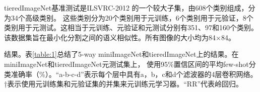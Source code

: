 tieredImageNet基准测试\cite{ren2018meta}是ILSVRC-2012 \cite{russakovsky2015imagenet}的一个较大子集，由608个类别组成，分为34个高级类别。
这些类别分为20个类别用于元训练，6个类别用于元验证，8个类别用于元测试。这相当于元训练、元验证和元测试分别有351、97和160个类别。
该数据集旨在最小化分割之间的语义相似性。所有图像的大小均为84×84。

结果。表\ref{table:1}总结了5-way miniImageNet和tieredImageNet上的结果。在miniImageNet和tieredImageNet元测试集上，
使用95\%置信区间的平均few-shot分类准确率（\%）。“a-b-c-d”表示每个层中具有a，b，c和d个滤波器的4层卷积网络。
†表示使用元训练集和元验证集的并集来元训练元学习器。“RR”代表岭回归。
\begin{table}[htbp]
\end{table}
